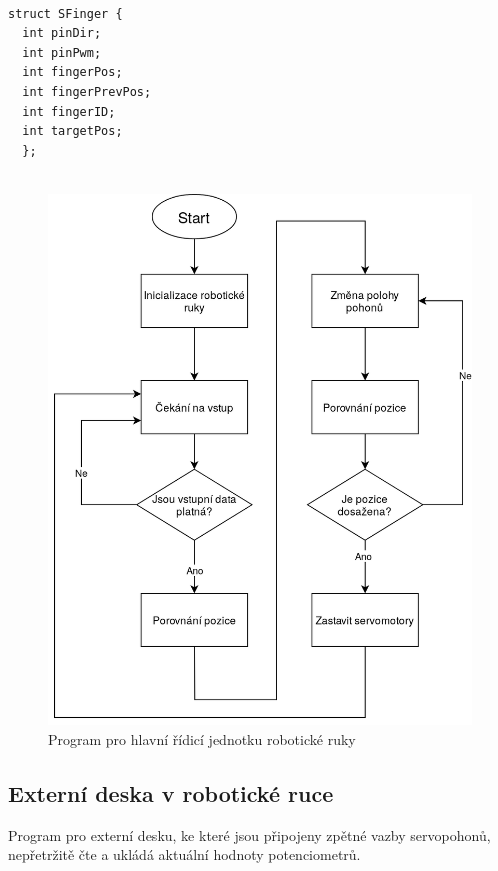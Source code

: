 \documentclass[thesis=B,czech]{FITthesis}[2012/06/26]
\begin{document}
\begin{lstlisting}[caption={Reprezentace motoru},label={code:structTFing}]

struct SFinger {
  int pinDir;
  int pinPwm;
  int fingerPos;
  int fingerPrevPos;   
  int fingerID;
  int targetPos;
  };
  
\end{lstlisting}

\newpage

 \begin{figure}[H]
\centering
\includegraphics[scale=0.3]{./image/ArdMProgDiagram.png}
\caption{Program pro hlavní řídicí jednotku robotické ruky}
\label{fig:ArdMProgDiagram}
\end{figure} 



\subsection{Externí deska v robotické ruce}

Program pro externí desku, ke které jsou připojeny zpětné vazby servopohonů, nepřetržitě čte a ukládá aktuální hodnoty potenciometrů. 
\end{document}
